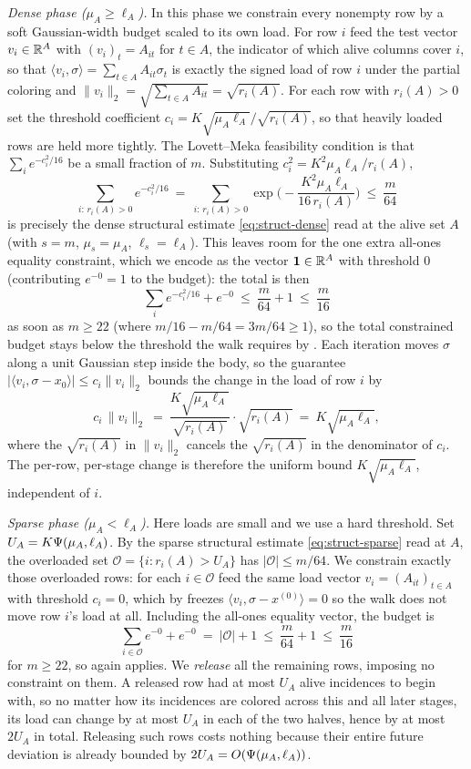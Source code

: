 \emph{Dense phase ($\mu_A\ge\ell_A$).} In this phase we constrain every nonempty row by a soft Gaussian-width budget scaled
to its own load. For row $i$ feed  the test vector $v_i\in\mathbb{R}^A$ with $(v_i)_t=A_{it}$ for $t\in A$, the
indicator of which alive columns cover $i$, so that $\langle v_i,\sigma\rangle=\sum_{t\in A}A_{it}\sigma_t$ is exactly the
signed load of row $i$ under the partial coloring and $\|v_i\|_2=\sqrt{\sum_{t\in A}A_{it}}=\sqrt{r_i(A)}$. For each row with
$r_i(A)>0$ set the threshold coefficient $c_i=K\sqrt{\mu_A\ell_A}/\sqrt{r_i(A)}$, so that heavily loaded rows are held more
tightly. The Lovett--Meka feasibility condition is that $\sum_i e^{-c_i^2/16}$ be a small fraction of $m$. Substituting
$c_i^2=K^2\mu_A\ell_A/r_i(A)$,
\[
  \sum_{i:\,r_i(A)>0} e^{-c_i^2/16}\ =\ \sum_{i:\,r_i(A)>0}\exp\!\Big(-\frac{K^2\mu_A\ell_A}{16\,r_i(A)}\Big)\ \le\ \frac{m}{64}
\]
is precisely the dense structural estimate \eqref{eq:struct-dense} read at the alive set $A$ (with $s=m$, $\mu_s=\mu_A$,
$\ell_s=\ell_A$). This leaves room for the one extra all-ones equality constraint, which we encode as the vector
$\mathbf 1\in\mathbb{R}^A$ with threshold $0$ (contributing $e^{-0}=1$ to the budget): the total is then
\[
  \sum_i e^{-c_i^2/16}+e^{-0}\ \le\ \frac{m}{64}+1\ \le\ \frac{m}{16}
\]
as soon as $m\ge 22$ (where $m/16-m/64=3m/64\ge1$), so the total constrained budget stays below the threshold the walk
requires by . Each iteration moves $\sigma$ along a unit Gaussian step inside the body, so the guarantee
$|\langle v_i,\sigma-x_0\rangle|\le c_i\|v_i\|_2$ bounds the change in the load of row $i$ by
\[
  c_i\,\|v_i\|_2\ =\ \frac{K\sqrt{\mu_A\ell_A}}{\sqrt{r_i(A)}}\cdot\sqrt{r_i(A)}\ =\ K\sqrt{\mu_A\ell_A},
\]
where the $\sqrt{r_i(A)}$ in $\|v_i\|_2$ cancels the $\sqrt{r_i(A)}$ in the denominator of $c_i$. The per-row, per-stage
change is therefore the uniform bound $K\sqrt{\mu_A\ell_A}$, independent of $i$.

\emph{Sparse phase ($\mu_A<\ell_A$).} Here loads are small and we use a hard threshold. Set $U_A=K\Psi(\mu_A,\ell_A)$. By
the sparse structural estimate \eqref{eq:struct-sparse} read at $A$, the overloaded set $\mathcal O=\{i:r_i(A)>U_A\}$ has
$|\mathcal O|\le m/64$. We constrain exactly those overloaded rows: for each $i\in\mathcal O$ feed the same load vector
$v_i=(A_{it})_{t\in A}$ with threshold $c_i=0$, which by  freezes $\langle v_i,\sigma-x^{(0)}\rangle=0$ so the
walk does not move row $i$'s load at all. Including the all-ones equality vector, the budget is
\[
  \sum_{i\in\mathcal O} e^{-0}+e^{-0}\ =\ |\mathcal O|+1\ \le\ \frac{m}{64}+1\ \le\ \frac{m}{16}
\]
for $m\ge22$, so  again applies. We \emph{release} all the remaining rows, imposing no constraint on them. A released row had at most $U_A$ alive incidences to begin with, so no matter how its
incidences are colored across this and all later stages, its load can change by at most $U_A$ in each of the two halves,
hence by at most $2U_A$ in total. Releasing such rows costs nothing because their entire future deviation is already bounded
by $2U_A=O(\Psi(\mu_A,\ell_A))$.

